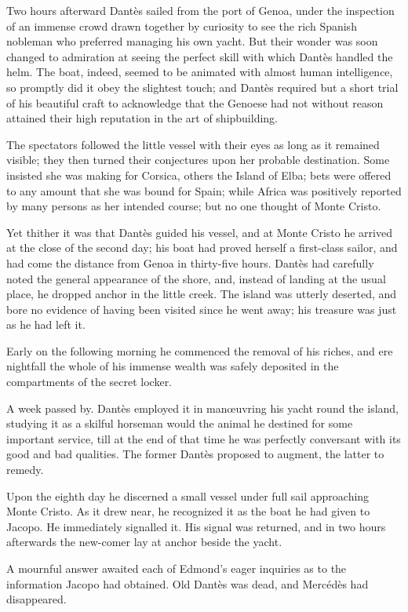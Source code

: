 Two hours afterward Dantès sailed from the port of Genoa, under the
inspection of an immense crowd drawn together by curiosity to see the
rich Spanish nobleman who preferred managing his own yacht. But their
wonder was soon changed to admiration at seeing the perfect skill with
which Dantès handled the helm. The boat, indeed, seemed to be animated
with almost human intelligence, so promptly did it obey the slightest
touch; and Dantès required but a short trial of his beautiful craft to
acknowledge that the Genoese had not without reason attained their high
reputation in the art of shipbuilding.

The spectators followed the little vessel with their eyes as long as it
remained visible; they then turned their conjectures upon her probable
destination. Some insisted she was making for Corsica, others the
Island of Elba; bets were offered to any amount that she was bound for
Spain; while Africa was positively reported by many persons as her
intended course; but no one thought of Monte Cristo.

Yet thither it was that Dantès guided his vessel, and at Monte Cristo
he arrived at the close of the second day; his boat had proved herself
a first-class sailor, and had come the distance from Genoa in
thirty-five hours. Dantès had carefully noted the general appearance of
the shore, and, instead of landing at the usual place, he dropped
anchor in the little creek. The island was utterly deserted, and bore
no evidence of having been visited since he went away; his treasure was
just as he had left it.

Early on the following morning he commenced the removal of his riches,
and ere nightfall the whole of his immense wealth was safely deposited
in the compartments of the secret locker.

A week passed by. Dantès employed it in manœuvring his yacht round the
island, studying it as a skilful horseman would the animal he destined
for some important service, till at the end of that time he was
perfectly conversant with its good and bad qualities. The former Dantès
proposed to augment, the latter to remedy.

Upon the eighth day he discerned a small vessel under full sail
approaching Monte Cristo. As it drew near, he recognized it as the boat
he had given to Jacopo. He immediately signalled it. His signal was
returned, and in two hours afterwards the new-comer lay at anchor
beside the yacht.

A mournful answer awaited each of Edmond’s eager inquiries as to the
information Jacopo had obtained. Old Dantès was dead, and Mercédès had
disappeared.

